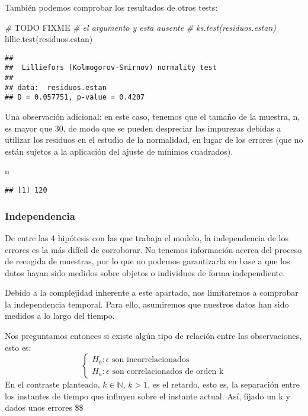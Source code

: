 \documentclass[
]{article}
\newenvironment{Shaded}{\begin{snugshade}}{\end{snugshade}}
\newcommand{\AlertTok}[1]{\textcolor[rgb]{0.94,0.16,0.16}{#1}}
\newcommand{\CommentTok}[1]{\textcolor[rgb]{0.56,0.35,0.01}{\textit{#1}}}
\newcommand{\FunctionTok}[1]{\textcolor[rgb]{0.00,0.00,0.00}{#1}}
\newcommand{\NormalTok}[1]{#1}
\begin{document}
También podemos comprobar los resultados de otros tests:

\begin{Shaded}
\begin{Highlighting}[]
\CommentTok{\# }\AlertTok{TODO}\CommentTok{ }\AlertTok{FIXME}
\CommentTok{\# el argumento y esta ausente}
\CommentTok{\# ks.test(residuos.estan)}
\FunctionTok{lillie.test}\NormalTok{(residuos.estan)}
\end{Highlighting}
\end{Shaded}

\begin{verbatim}
## 
##  Lilliefors (Kolmogorov-Smirnov) normality test
## 
## data:  residuos.estan
## D = 0.057751, p-value = 0.4207
\end{verbatim}

Una observación adicional: en este caso, tenemos que el tamaño de la
muestra, n, es mayor que 30, de modo que se pueden despreciar las
impurezas debidas a utilizar los residuos en el estudio de la
normalidad, en lugar de los errores (que no están sujetos a la
aplicación del ajuste de mínimos cuadrados).

\begin{Shaded}
\begin{Highlighting}[]
\NormalTok{n}
\end{Highlighting}
\end{Shaded}

\begin{verbatim}
## [1] 120
\end{verbatim}

\hypertarget{independencia}{%
\subsubsection{Independencia}\label{independencia}}

De entre las 4 hipótesis con las que trabaja el modelo, la independencia
de los errores es la más difícil de corroborar. No tenemos información
acerca del proceso de recogida de muestras, por lo que no podemos
garantizarla en base a que los datos hayan sido medidos sobre objetos o
individuos de forma independiente.

Debido a la complejidad inherente a este apartado, nos limitaremos a
comprobar la independencia temporal. Para ello, asumiremos que nuestros
datos han sido medidos a lo largo del tiempo.

Nos preguntamos entonces si existe algún tipo de relación entre las
observaciones, esto es: \[
\begin{cases}
H_0: \epsilon\text{ son incorrelacionados}\\
H_a: \epsilon\text{ son correlacionados de orden k}
\end{cases}
\] En el contraste planteado, \(k\in\mathbb{N}\), \(k>1\), es el
retardo, esto es, la separación entre los instantes de tiempo que
influyen sobre el instante actual. Así, fijado un k y dados unos errores
\$\$
\end{document}
